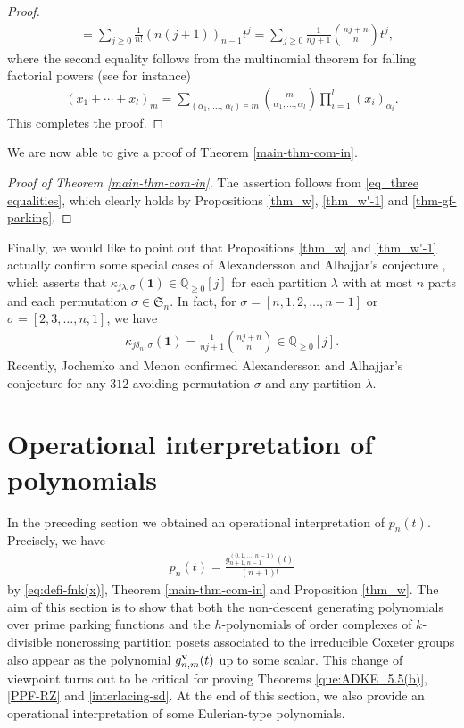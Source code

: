 \documentclass[12pt]{article}
\newcommand{\PP}{p}
\numberwithin{equation}{section}
\begin{document}
\begin{proof}
\begin{align*}
&=\sum_{j\geq 0}\frac{1}{n!}(n(j+1))_{n-1} t^j=\sum_{j\geq 0}\frac{1}{nj+1}\binom{nj+n}{n}t^j,
\end{align*}
where the second equality follows from  the multinomial theorem for falling factorial powers (see \cite[Fact 1]{Creed-Cryan-2010} for instance)
\begin{align*}%
(x_1+\cdots+x_l)_m=\sum_{(\alpha_1,\,\ldots,\,\alpha_l)\vDash m}\binom{m}{\alpha_1,\ldots,\alpha_l}\prod_{i=1}^l (x_i)_{\alpha_i}.
\end{align*}
This completes the proof. 
\end{proof}

We are now able to give a proof of Theorem \ref{main-thm-com-in}.

\begin{proof}[Proof of Theorem \ref{main-thm-com-in}]
The assertion follows from \eqref{eq_three equalities}, which clearly holds by Propositions \ref{thm_w}, \ref{thm_w'-1} and \ref{thm-gf-parking}.
\end{proof}

Finally, we would like to point out that Propositions \ref{thm_w} and \ref{thm_w'-1} actually confirm some special cases of Alexandersson and Alhajjar's conjecture
\cite[P.~11]{Alexandersson-Alhajjar-2019}, which asserts that $\kappa_{j\lambda,\sigma}(\mathbf{1})\in\mathbb{Q}_{\ge 0}[j]$ for each partition $\lambda$ with at
most $n$ parts and each permutation $\sigma\in\mathfrak{S}_n$. In fact, for $\sigma=[n,1,2,\ldots,n-1]$ or $\sigma=[2,3,\ldots,n,1]$, we have
\begin{align*}
\kappa_{j\delta_n,\sigma}(\mathbf{1})=\frac{1}{nj+1}\binom{nj+n}{n}\in\mathbb{Q}_{\ge 0}[j].
\end{align*}
Recently, Jochemko and Menon \cite[P.~6]{Jochemko-Menon-2026} confirmed Alexandersson and Alhajjar's conjecture for any
$312$-avoiding permutation $\sigma$ and any partition $\lambda$.

\section{Operational interpretation of polynomials} \label{sec 3}
In the preceding section we obtained an operational interpretation of $\PP_n(t)$. 
Precisely, we have 
\begin{align}\label{eq-ppn-gnmv-def}
\PP_{n}(t)=\frac{g^{{(0,1,\ldots,n-1)}}_{n+1,n-1}(t)}{(n+1)!}
\end{align}
by \eqref{eq:defi-fnk(x)}, Theorem \ref{main-thm-com-in} and Proposition \ref{thm_w}. 
The aim of this section is to show that both the non-descent generating polynomials over prime parking functions 
and the $h$-polynomials of order complexes of $k$-divisible noncrossing partition posets associated to the irreducible Coxeter groups  
also appear as the polynomial $g^{\bf{v}}_{n,m}(t)$ up to some scalar. 
This change of viewpoint turns out to be critical for proving Theorems \ref{que:ADKE_5.5(b)}, \ref{PPF-RZ} and \ref{interlacing-sd}.
At the end of this section, we also provide an operational interpretation of some Eulerian-type polynomials. 
\end{document}
